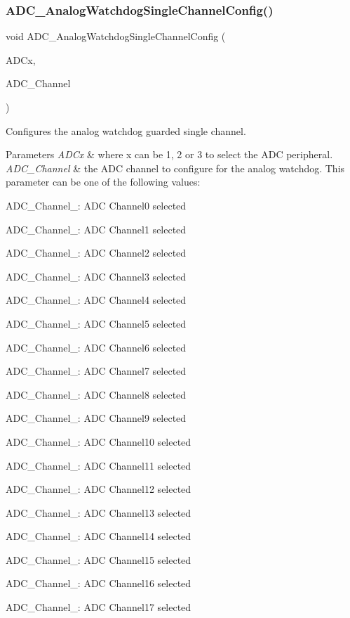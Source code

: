 \subsubsection{\texorpdfstring{ADC\_AnalogWatchdogSingleChannelConfig()}{ADC\_AnalogWatchdogSingleChannelConfig()}}
{\footnotesize\ttfamily void A\+D\+C\+\_\+\+Analog\+Watchdog\+Single\+Channel\+Config (\begin{DoxyParamCaption}\item[{\mbox{\hyperlink{struct_a_d_c___type_def}{A\+D\+C\+\_\+\+Type\+Def}} $\ast$}]{A\+D\+Cx,  }\item[{uint8\+\_\+t}]{A\+D\+C\+\_\+\+Channel }\end{DoxyParamCaption})}



Configures the analog watchdog guarded single channel. 


\begin{DoxyParams}{Parameters}
{\em A\+D\+Cx} & where x can be 1, 2 or 3 to select the A\+DC peripheral. \\
\hline
{\em A\+D\+C\+\_\+\+Channel} & the A\+DC channel to configure for the analog watchdog. This parameter can be one of the following values\+: \begin{DoxyItemize}
\item A\+D\+C\+\_\+\+Channel\+\_\+: A\+DC Channel0 selected \item A\+D\+C\+\_\+\+Channel\+\_\+: A\+DC Channel1 selected \item A\+D\+C\+\_\+\+Channel\+\_\+: A\+DC Channel2 selected \item A\+D\+C\+\_\+\+Channel\+\_\+: A\+DC Channel3 selected \item A\+D\+C\+\_\+\+Channel\+\_\+: A\+DC Channel4 selected \item A\+D\+C\+\_\+\+Channel\+\_\+: A\+DC Channel5 selected \item A\+D\+C\+\_\+\+Channel\+\_\+: A\+DC Channel6 selected \item A\+D\+C\+\_\+\+Channel\+\_\+: A\+DC Channel7 selected \item A\+D\+C\+\_\+\+Channel\+\_\+: A\+DC Channel8 selected \item A\+D\+C\+\_\+\+Channel\+\_\+: A\+DC Channel9 selected \item A\+D\+C\+\_\+\+Channel\+\_\+: A\+DC Channel10 selected \item A\+D\+C\+\_\+\+Channel\+\_\+: A\+DC Channel11 selected \item A\+D\+C\+\_\+\+Channel\+\_\+: A\+DC Channel12 selected \item A\+D\+C\+\_\+\+Channel\+\_\+: A\+DC Channel13 selected \item A\+D\+C\+\_\+\+Channel\+\_\+: A\+DC Channel14 selected \item A\+D\+C\+\_\+\+Channel\+\_\+: A\+DC Channel15 selected \item A\+D\+C\+\_\+\+Channel\+\_\+: A\+DC Channel16 selected \item A\+D\+C\+\_\+\+Channel\+\_\+: A\+DC Channel17 selected \end{DoxyItemize}
\\
\hline
\end{DoxyParams}


